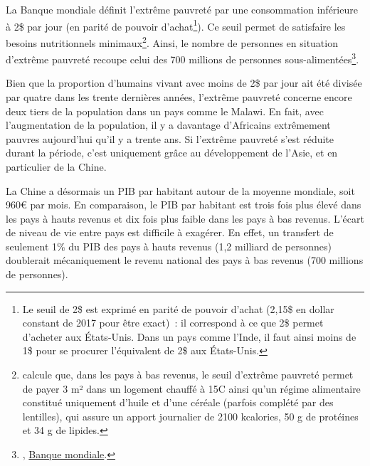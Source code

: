 \documentclass[a5paper,french]{memoir}
\begin{document}
La Banque mondiale définit l'extrême pauvreté par une consommation inférieure à 2\$ par jour (en parité de pouvoir d'achat\footnote{Le seuil de 2\$ est exprimé en parité de pouvoir d'achat (2,15\$ en dollar constant de 2017 pour être exact)~: il correspond à ce que 2\$ permet d'acheter aux États-Unis. Dans un pays comme l'Inde, il faut ainsi moins de 1\$ pour se procurer l'équivalent de 2\$ aux États-Unis.}). %
Ce seuil permet de satisfaire les besoins nutritionnels minimaux\footnote{\citet{allen_absolute_2017-1} calcule que, dans les pays à bas revenus, le seuil d'extrême pauvreté permet de payer 3 m² dans un logement chauffé à 15\textdegree{}C ainsi qu'un régime alimentaire constitué uniquement d'huile et d'une céréale (parfois complété par des lentilles), qui assure un apport journalier de 2100 kcalories, 50 g de protéines et 34 g de lipides.}. Ainsi, le nombre de personnes en situation d'extrême pauvreté recoupe celui des 700 millions de personnes sous-alimentées\footnote{\citet{fao_state_2023}, \href{https://data.worldbank.org/indicator/SI.POV.DDAY?end=2019&locations=MW-1W&start=1990&view=chart}{Banque mondiale}.}. 

Bien que la proportion d'humains vivant avec moins de 2\$ par jour ait été divisée par quatre dans les trente dernières années, l'extrême pauvreté concerne encore deux tiers de la population dans un pays comme le Malawi. En fait, avec l'augmentation de la population, il y a davantage d'Africains extrêmement pauvres aujourd'hui qu'il y a trente ans. Si l'extrême pauvreté s'est réduite durant la période, c'est uniquement grâce au développement de l'Asie, et en particulier de la Chine. %

La Chine a désormais un PIB par habitant autour de la moyenne mondiale, soit 960\euro{} par mois. %
En comparaison, le PIB par habitant est trois fois plus élevé dans les pays à hauts revenus et dix fois plus faible dans les pays à bas revenus. L'écart de niveau de vie entre pays est difficile à exagérer. En effet, un transfert de seulement 1\% du PIB des pays à hauts revenus (1,2 milliard de personnes) doublerait mécaniquement le revenu national des pays à bas revenus (700 millions de personnes). 
\end{document}
